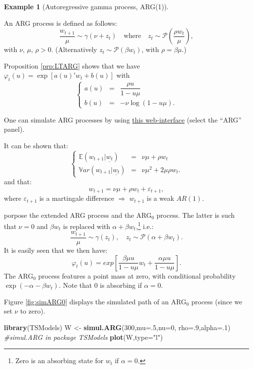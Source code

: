 \documentclass[
  12pt,
]{book}
\newenvironment{Shaded}{\begin{snugshade}}{\end{snugshade}}
\newcommand{\AttributeTok}[1]{\textcolor[rgb]{0.13,0.29,0.53}{#1}}
\newcommand{\CommentTok}[1]{\textcolor[rgb]{0.56,0.35,0.01}{\textit{#1}}}
\newcommand{\DecValTok}[1]{\textcolor[rgb]{0.00,0.00,0.81}{#1}}
\newcommand{\FunctionTok}[1]{\textcolor[rgb]{0.13,0.29,0.53}{\textbf{#1}}}
\newcommand{\NormalTok}[1]{#1}
\newcommand{\OtherTok}[1]{\textcolor[rgb]{0.56,0.35,0.01}{#1}}
\newcommand{\StringTok}[1]{\textcolor[rgb]{0.31,0.60,0.02}{#1}}
\theoremstyle{definition}
\theoremstyle{definition}
\newtheorem{example}{Example}[chapter]
\theoremstyle{definition}
\theoremstyle{definition}
\theoremstyle{remark}
\begin{document}
\begin{example}[Autoregressive gamma process, ARG(1)]
\protect\hypertarget{exm:ARG1}{}\label{exm:ARG1}

An ARG process is defined as follows:
\[
\frac{w_{t+1}}{\mu} \sim \gamma(\nu+z_t) \quad \mbox{where} \quad z_t \sim \mathcal{P} \left( \frac{\rho w_t}{\mu} \right),
\]
with \(\nu\), \(\mu\), \(\rho > 0\). (Alternatively \(z_t \sim {\mathcal{P}}(\beta w_t)\), with \(\rho = \beta \mu\).)

Proposition \ref{prp:LTARG} shows that we have \(\varphi_t(u) = \exp[a(u)'w_t+b(u)]\) with
\[
\left\{
\begin{array}{cll}
a(u) &=&  \dfrac{\rho u}{1-u \mu}\\
b(u) &=& -\nu  
\log(1-u \mu).
\end{array}
\right.
\]

One can simulate ARG processes by using \href{https://jrenne.shinyapps.io/Affine/}{this web-interface} (select the ``ARG'' panel).

It can be shown that:
\[
\left\{
\begin{array}{cll}
\mathbb{E}(w_{t+1}|\underline{w_t}) &=& \nu \mu + \rho w_t \\
\mathbb{V}ar(w_{t+1}|\underline{w_t}) &=& \nu \mu^2 + 2 \mu \rho w_t.
\end{array}
\right.
\]
and that:
\[
w_{t+1}=\nu\mu+\rho w_t+\varepsilon_{t+1},
\]
where \(\varepsilon_{t+1}\) is a martingale difference \(\Rightarrow\) \(w_{t+1}\) is a weak \(AR(1)\).

\citet{zarg_2017} porpose the extended ARG process and the ARG\(_0\) process. The latter is such that \(\nu = 0\) and \(\beta w_t\) is replaced with \(\alpha + \beta w_t\),\footnote{Zero is an absorbing state for \(w_t\) if \(\alpha = 0\).} i.e.:
\begin{equation}
\frac{w_{t+1}}{\mu} \sim \gamma(z_t),\quad z_t \sim {\mathcal{P}}(\alpha + \beta w_t).\label{eq:ARG0}
\end{equation}
It is easily seen that we then have:
\[
\varphi_t(u) = exp \left[\frac{\beta \mu u}{1-u \mu} w_t + \frac{\alpha \mu u}{1-u \mu}
\right].
\]
The ARG\(_0\) process features a point mass at zero, with conditional probability \(\exp(-\alpha - \beta w_t)\). Note that 0 is absorbing if \(\alpha = 0\).

Figure \ref{fig:simARG0} displays the simulated path of an ARG\(_0\) process (since we set \(\nu\) to zero).

\begin{Shaded}
\begin{Highlighting}[]
\FunctionTok{library}\NormalTok{(TSModels)}
\NormalTok{W }\OtherTok{\textless{}{-}} \FunctionTok{simul.ARG}\NormalTok{(}\DecValTok{300}\NormalTok{,}\AttributeTok{mu=}\NormalTok{.}\DecValTok{5}\NormalTok{,}\AttributeTok{nu=}\DecValTok{0}\NormalTok{,}
               \AttributeTok{rho=}\NormalTok{.}\DecValTok{9}\NormalTok{,}\AttributeTok{alpha=}\NormalTok{.}\DecValTok{1}\NormalTok{) }\CommentTok{\#simul.ARG in package TSModels}
\FunctionTok{plot}\NormalTok{(W,}\AttributeTok{type=}\StringTok{"l"}\NormalTok{)}
\end{Highlighting}
\end{Shaded}


\end{example}
\end{document}
